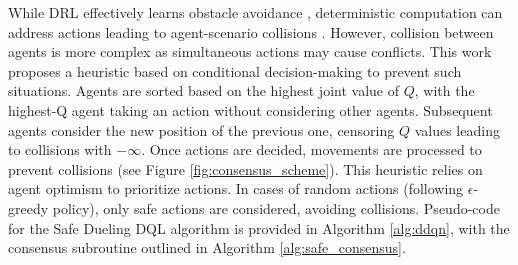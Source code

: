 \documentclass[journal]{IEEEtran}
\newcommand\changes[1]{\textcolor{black}{#1}}
\begin{document}

While DRL effectively learns obstacle avoidance \cite{yanes_deep_2020}, deterministic computation can address actions leading to agent-scenario collisions \cite{censoring_yanes_2022}. However, collision between agents is more complex as simultaneous actions may cause conflicts. This work proposes a heuristic based on conditional decision-making to prevent such situations. Agents are sorted based on the highest joint value of $Q$, with the highest-Q agent taking an action without considering other agents. Subsequent agents consider the new position of the previous one, censoring $Q$ values leading to collisions with $-\infty$. Once actions are decided, movements are processed to prevent collisions (see Figure \ref{fig:consensus_scheme}). This heuristic relies on agent optimism to prioritize actions. In cases of random actions (following $\epsilon$-greedy policy), only safe actions are considered, avoiding collisions. Pseudo-code for the Safe Dueling DQL algorithm is provided in Algorithm \ref{alg:ddqn}, with the consensus subroutine outlined in Algorithm \ref{alg:safe_consensus}.
\end{document}
